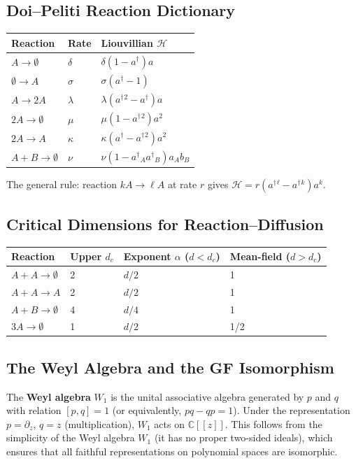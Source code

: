 \documentclass[11pt,a4paper]{article}
\theoremstyle{definition}
\newcommand{\C}{\mathbb{C}}
\newcommand{\ad}{a^\dagger}
\begin{document}
\subsection{Doi--Peliti Reaction Dictionary}

\begin{center}
\begin{tabular}{lll}
\toprule
Reaction & Rate & Liouvillian $\mathcal{H}$ \\
\midrule
$A \to \emptyset$ & $\delta$ & $\delta(1-\ad)a$ \\
$\emptyset \to A$ & $\sigma$ & $\sigma(\ad - 1)$ \\
$A \to 2A$ & $\lambda$ & $\lambda(\ad{}^2 - \ad)a$ \\
$2A \to \emptyset$ & $\mu$ & $\mu(1 - \ad{}^2)a^2$ \\
$2A \to A$ & $\kappa$ & $\kappa(\ad - \ad{}^2)a^2$ \\
$A + B \to \emptyset$ & $\nu$ & $\nu(1 - \ad{}_A\ad{}_B)a_Ab_B$ \\
\bottomrule
\end{tabular}
\end{center}

The general rule: reaction $kA \to \ell A$ at rate $r$ gives
$\mathcal{H} = r(\ad{}^\ell - \ad{}^k)a^k$.

\subsection{Critical Dimensions for Reaction--Diffusion}

\begin{center}
\begin{tabular}{llll}
\toprule
Reaction & Upper $d_c$ & Exponent $\alpha$ ($d<d_c$) & Mean-field ($d>d_c$) \\
\midrule
$A + A \to \emptyset$ & 2 & $d/2$ & 1 \\
$A + A \to A$ & 2 & $d/2$ & 1 \\
$A + B \to \emptyset$ & 4 & $d/4$ & 1 \\
$3A \to \emptyset$ & 1 & $d/2$ & 1/2 \\
\bottomrule
\end{tabular}
\end{center}

\subsection{The Weyl Algebra and the GF Isomorphism}

The \textbf{Weyl algebra} $W_1$ is the unital associative algebra generated by $p$
and $q$ with relation $[p, q] = 1$ (or equivalently, $pq - qp = 1$). Under the
representation $p = \partial_z$, $q = z$ (multiplication), $W_1$ acts on $\C[[z]]$.
This follows from the simplicity of the Weyl algebra $W_1$ (it has no proper
two-sided ideals), which ensures that all faithful representations on polynomial
spaces are isomorphic.
\end{document}
